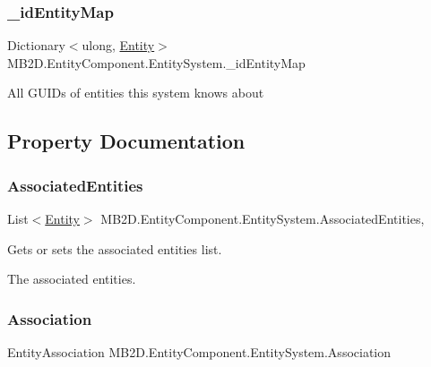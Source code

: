 \subsubsection{\texorpdfstring{\+\_\+id\+Entity\+Map}{\_idEntityMap}}
{\footnotesize\ttfamily Dictionary$<$ulong, \hyperlink{class_m_b2_d_1_1_entity_component_1_1_entity}{Entity}$>$ M\+B2\+D.\+Entity\+Component.\+Entity\+System.\+\_\+id\+Entity\+Map\hspace{0.3cm}{\ttfamily [protected]}}



All G\+U\+ID\textquotesingle{}s of entities this system knows about 



\subsection{Property Documentation}
\hypertarget{class_m_b2_d_1_1_entity_component_1_1_entity_system_a1c442059af272594b0485832c9f44e94}{}\label{class_m_b2_d_1_1_entity_component_1_1_entity_system_a1c442059af272594b0485832c9f44e94} 
\subsubsection{\texorpdfstring{Associated\+Entities}{AssociatedEntities}}
{\footnotesize\ttfamily List$<$\hyperlink{class_m_b2_d_1_1_entity_component_1_1_entity}{Entity}$>$ M\+B2\+D.\+Entity\+Component.\+Entity\+System.\+Associated\+Entities\hspace{0.3cm}{\ttfamily [get]}, {\ttfamily [set]}}



Gets or sets the associated entities list. 

The associated entities.\hypertarget{class_m_b2_d_1_1_entity_component_1_1_entity_system_af68858392489a7aab3c91122ab48865f}{}\label{class_m_b2_d_1_1_entity_component_1_1_entity_system_af68858392489a7aab3c91122ab48865f} 
\subsubsection{\texorpdfstring{Association}{Association}}
{\footnotesize\ttfamily Entity\+Association M\+B2\+D.\+Entity\+Component.\+Entity\+System.\+Association\hspace{0.3cm}{\ttfamily [get]}}



